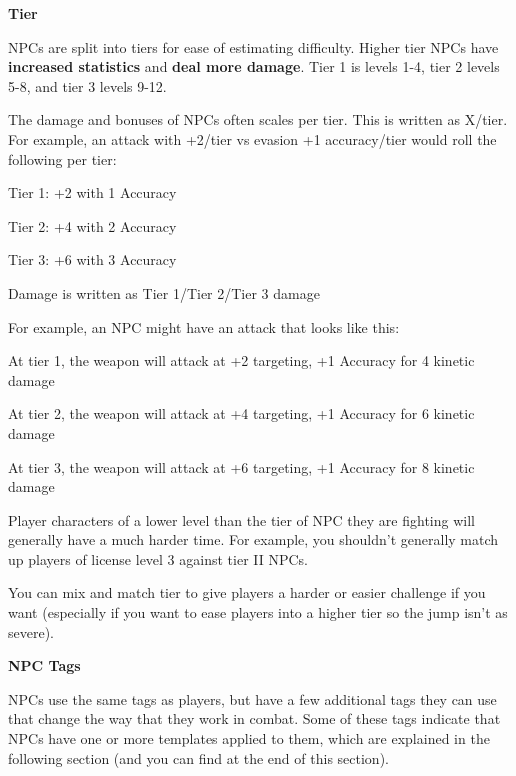 \begin{center}
    \textbf{Tier}
\end{center}

NPCs are split into tiers for ease of estimating difficulty. Higher tier NPCs have \textbf{increased
statistics} and \textbf{deal more damage}. Tier 1 is levels 1-4, tier 2 levels 5-8, and tier 3 levels 9-12.

The damage and bonuses of NPCs often scales per tier. This is written as X/tier. For example, an
attack with +2/tier vs evasion +1 accuracy/tier would roll the following per tier:


Tier 1: +2 with 1 Accuracy

Tier 2: +4 with 2 Accuracy

Tier 3: +6 with 3 Accuracy


Damage is written as Tier 1/Tier 2/Tier 3 damage

For example, an NPC might have an attack that looks like this:

\npcGearBox[name = {Assault Rifle},
template = {\Main \Rifle\\
    +2 vs evasion/tier with +1 Accuracy\\
    Range 10\\
    4/6/8 \kinetic damage}]


At tier 1, the weapon will attack at +2 targeting, +1 Accuracy for 4 kinetic damage

At tier 2, the weapon will attack at +4 targeting, +1 Accuracy for 6 kinetic damage

At tier 3, the weapon will attack at +6 targeting, +1 Accuracy for 8 kinetic damage

Player characters of a lower level than the tier of NPC they are fighting will generally have a much
harder time. For example, you shouldn’t generally match up players of license level 3 against tier
II NPCs.

You can mix and match tier to give players a harder or easier challenge if you want (especially if
you want to ease players into a higher tier so the jump isn’t as severe).

\begin{center}
    \textbf{NPC Tags}
\end{center}

NPCs use the same tags as players, but have a few additional tags they can use that change the
way that they work in combat. Some of these tags indicate that NPCs have one or more
templates applied to them, which are explained in the following section (and you can find at the
end of this section).

